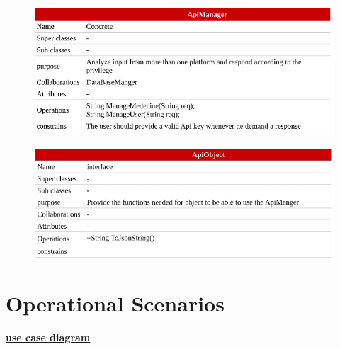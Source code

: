 \documentclass[]{article}
\begin{document}
\begin{figure}[H]
\centering
\includegraphics[scale=0.4]{./classdiagram/description/17}
\end{figure}

\begin{figure}[H]
\centering
\includegraphics[scale=0.4]{./classdiagram/description/18}
\end{figure}


\section{Operational Scenarios}

\textbf{\underline{use case diagram}}
\end{document}
